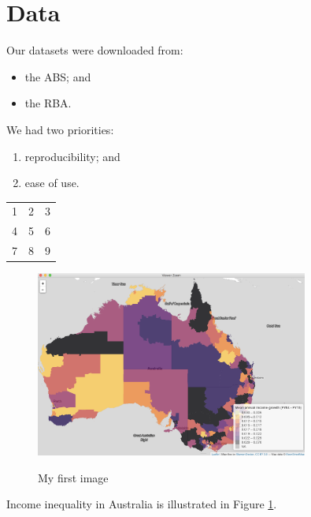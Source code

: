\documentclass[a4paper, 12pt]{article}
\begin{document}
\section{Data}
Our datasets were downloaded from:
\begin{itemize}
\item the ABS; and
\item the RBA.
\end{itemize}

We had two priorities:
\begin{enumerate}
\item reproducibility; and
\item ease of use.
\end{enumerate}

\begin{tabular}{ l | c || r }
  \hline
  1 & 2 & 3 \\
  4 & 5 & 6 \\
  7 & 8 & 9 \\
  \hline  
\end{tabular}
  
\begin{figure}[h!]
\caption{My first image}
\center
\includegraphics[width=0.80\textwidth]{me.png}\label{australia_map}
\end{figure}

Income inequality in Australia is illustrated in Figure \ref{australia_map}.



\end{document}
